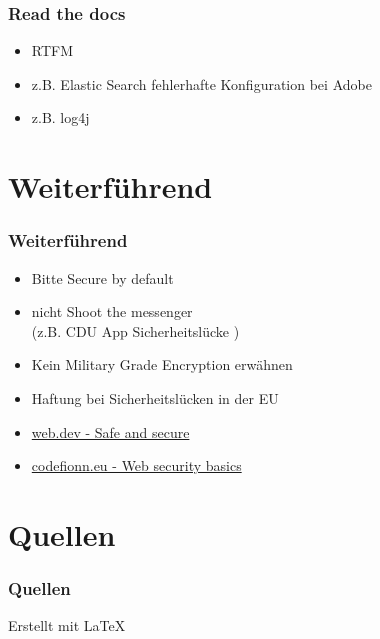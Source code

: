 \documentclass[ngerman2]{beamer}
\begin{document}
\begin{frame}[fragile]
\frametitle{Read the docs}
  \begin{itemize}
		\item RTFM
    \item z.B. Elastic Search fehlerhafte Konfiguration bei Adobe
      \cite{adobeelasticsearch}
    \item z.B. log4j
      \cite{CVE202144228}
  \end{itemize}
\end{frame}

\section{Weiterführend}

\begin{frame}
\frametitle{Weiterführend}
  \begin{itemize}
    \item Bitte Secure by default
    \item nicht Shoot the messenger\\
      (z.B. CDU App Sicherheitslücke \cite{csuapp})
    \item Kein Military Grade Encryption erwähnen
    \item Haftung bei Sicherheitslücken in der EU \cite{eusechaftung}
    \item \href{https://web.dev/secure/}{web.dev - Safe and secure}
    \item \href{https://codefionn.eu/web-security-basics/}{codefionn.eu - Web security basics}
  \end{itemize}
\end{frame}

\section{Quellen}

\begin{frame}[allowframebreaks]
\frametitle{Quellen}
  \printbibliography
  \small{Erstellt mit \LaTeX}
\end{frame}
\end{document}

